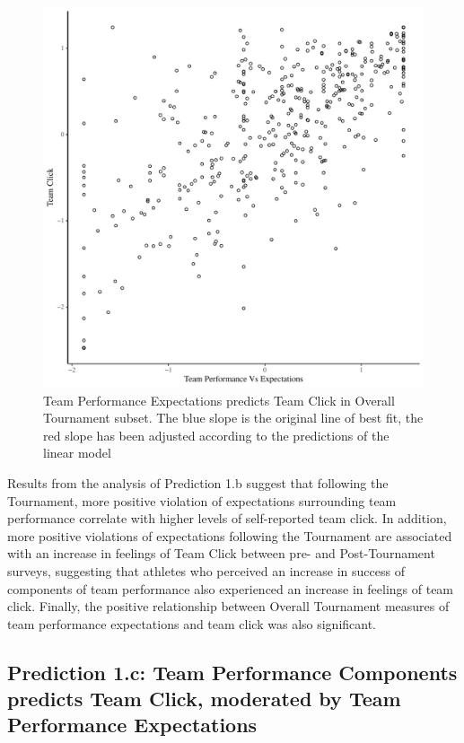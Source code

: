 \begin{CJK}{UTF8}{gbsn}
   \begin{figure}[htbp]
     \centering
   \includegraphics[scale=.5]{images/teamPerfClickOverallBasicXY.pdf}
     \caption{Team Performance Expectations predicts Team Click in Overall Tournament subset. The blue slope is the original line of best fit, the red slope has been adjusted according to the predictions of the linear model}
     \label{fig:teamPerfClickOverallModelSlope}
   \end{figure}

Results from the analysis of Prediction 1.b suggest that following the Tournament, more positive violation of expectations surrounding team performance correlate with higher levels of self-reported team click.  In addition, more positive violations of expectations following the Tournament are associated with an increase in feelings of Team Click between pre- and Post-Tournament surveys, suggesting that athletes who perceived an increase in success of components of team performance also experienced an increase in feelings of team click.  Finally, the positive relationship between Overall Tournament measures of team performance expectations and team click was also significant.




\subsection{Prediction 1.c: Team Performance Components predicts Team Click, moderated by Team Performance Expectations}


\end{CJK}

